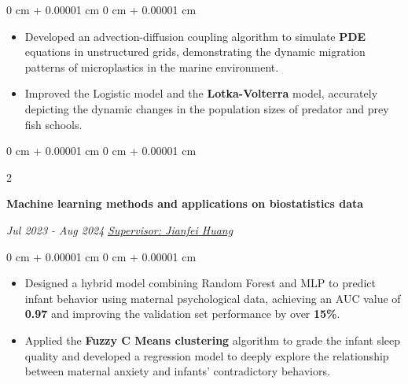 \documentclass[10pt, letterpaper]{article}
\newenvironment{highlights}{
    \begin{itemize}[
        topsep=0.10 cm,
        parsep=0.10 cm,
        partopsep=0pt,
        itemsep=0pt,
        leftmargin=0 cm + 10pt
    ]
}{
    \end{itemize}
} %
\newenvironment{onecolentry}{
    \begin{adjustwidth}{
        0 cm + 0.00001 cm
    }{
        0 cm + 0.00001 cm
    }
}{
    \end{adjustwidth}
} %
\newenvironment{twocolentry}[2][]{
    \onecolentry
    \def\secondColumn{#2}
    \setcolumnwidth{\fill, 4.5 cm}
    \begin{paracol}{2}
}{
    \switchcolumn \raggedleft \secondColumn
    \end{paracol}
    \endonecolentry
} %
\begin{document}
        \vspace{0.20 cm}
        \begin{onecolentry}
            \begin{highlights}
                \item Developed an advection-diffusion coupling algorithm to simulate \textbf{PDE} equations in unstructured grids, demonstrating the dynamic migration patterns of microplastics in the marine environment.
                \item      Improved the Logistic model and the \textbf{Lotka-Volterra} model, accurately depicting the dynamic changes in the population sizes of predator and prey fish schools.
            \end{highlights}
        \end{onecolentry}

  

        \vspace{0.3 cm}



        

        \begin{twocolentry}{
            \textit{Jul 2023 - Aug 2024}
            \href{https://sxxy.yzu.edu.cn/en/info/1090/1017.htm}{\textit{Supervisor: Jianfei Huang}}
        }
            \textbf{Machine learning methods and applications on biostatistics data}
        
        \end{twocolentry}

        \vspace{0.10 cm}
        \begin{onecolentry}
            \begin{highlights}
                \item Designed a hybrid model combining Random Forest and MLP  to predict infant behavior using maternal psychological data, achieving an AUC value of \textbf{0.97} and improving the validation set performance by over \textbf{15\%}.
               
                \item  Applied the \textbf{Fuzzy C  Means clustering} algorithm to grade the infant sleep quality and developed a regression model to deeply explore the relationship between maternal anxiety and infants' contradictory behaviors.
        
    
            \end{highlights}
        \end{onecolentry}
\end{document}
